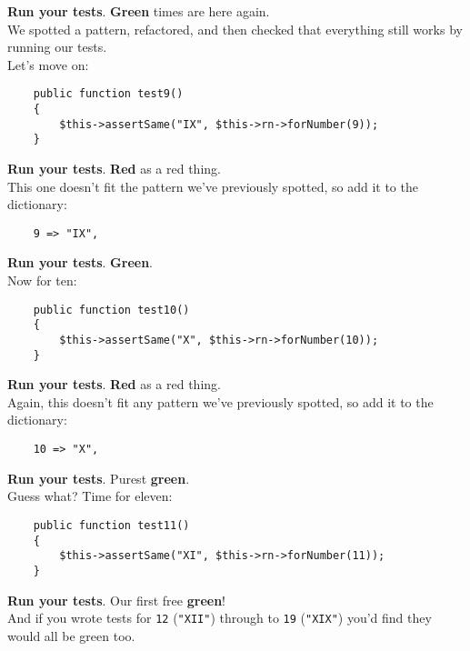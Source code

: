 \textbf{Run your tests}. \textbf{Green} times are here again.
\\

We spotted a pattern, refactored, and then checked that everything still works by running our tests.
\\

Let's move on:

\begin{verbatim}
    public function test9()
    {
        $this->assertSame("IX", $this->rn->forNumber(9));
    }
\end{verbatim}

\textbf{Run your tests}. \textbf{Red} as a red thing.
\\

This one doesn't fit the pattern we've previously spotted, so add it to the dictionary:

\begin{verbatim}
    9 => "IX",
\end{verbatim}

\textbf{Run your tests}. \textbf{Green}.
\\

Now for ten:

\begin{verbatim}
    public function test10()
    {
        $this->assertSame("X", $this->rn->forNumber(10));
    }
\end{verbatim}

\textbf{Run your tests}. \textbf{Red} as a red thing.
\\

Again, this doesn't fit any pattern we've previously spotted, so add it to the dictionary:

\begin{verbatim}
    10 => "X",
\end{verbatim}

\textbf{Run your tests}. Purest \textbf{green}.
\\

Guess what? Time for eleven:

\begin{verbatim}
    public function test11()
    {
        $this->assertSame("XI", $this->rn->forNumber(11));
    }
\end{verbatim}

\textbf{Run your tests}. Our first free \textbf{green}!
\\

And if you wrote tests for \texttt{12} (\texttt{"XII"}) through to \texttt{19} (\texttt{"XIX"}) you'd find they would all be green too.
\\

